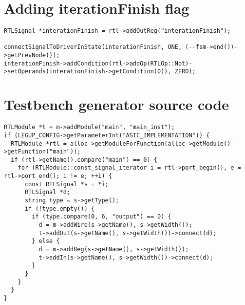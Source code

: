 \section{\label{sec:iterationfinishsourcecode}Adding iterationFinish flag}
\begin{lstlisting}
RTLSignal *interationFinish = rtl->addOutReg("interationFinish");

connectSignalToDriverInState(interationFinish, ONE, (--fsm->end())->getPrevNode());
interationFinish->addCondition(rtl->addOp(RTLOp::Not)->setOperands(interationFinish->getCondition(0)), ZERO);
\end{lstlisting}

\section{\label{sec:tbgenerationsourcecode}Testbench generator source code}
\begin{lstlisting}
RTLModule *t = m->addModule("main", "main_inst");
if (LEGUP_CONFIG->getParameterInt("ASIC_IMPLEMENTATION")) {
  RTLModule *rtl = alloc->getModuleForFunction(alloc->getModule()->getFunction("main"));
  if (rtl->getName().compare("main") == 0) {
    for (RTLModule::const_signal_iterator i = rtl->port_begin(), e = rtl->port_end(); i != e; ++i) {
      const RTLSignal *s = *i;
      RTLSignal *d;
      string type = s->getType();
      if (!type.empty()) {
        if (type.compare(0, 6, "output") == 0) {
          d = m->addWire(s->getName(), s->getWidth());
          t->addOut(s->getName(), s->getWidth())->connect(d);
        } else {
          d = m->addReg(s->getName(), s->getWidth());
          t->addIn(s->getName(), s->getWidth())->connect(d);
        }
      }
    }
  }
}
\end{lstlisting}
\clearpage
